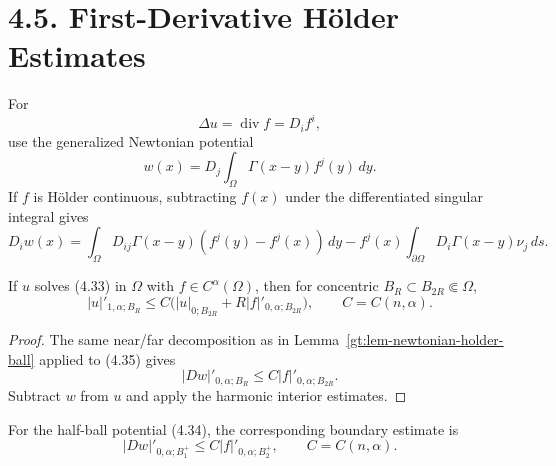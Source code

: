 \section*{4.5. First-Derivative H\"older Estimates}

For
\begin{equation}
\tag{4.33}
\Delta u=\operatorname{div}f=D_if^i,
\end{equation}
use the generalized Newtonian potential
\begin{equation}
\tag{4.34}
w(x)=D_j\int_\Omega\Gamma(x-y)f^j(y)\,dy.
\end{equation}
If $f$ is H\"older continuous, subtracting $f(x)$ under the differentiated
singular integral gives
\begin{equation}
\tag{4.35}
D_iw(x)=\int_\Omega D_{ij}\Gamma(x-y)(f^j(y)-f^j(x))\,dy
-f^j(x)\int_{\partial\Omega}D_i\Gamma(x-y)\nu_j\,ds.
\end{equation}

\begin{theorem}\label{gt:thm-poisson-first-derivative-interior}
If $u$ solves (4.33) in $\Omega$ with $f\in C^\alpha(\Omega)$, then for
concentric $B_R\subset B_{2R}\Subset\Omega$,
\begin{equation}
\tag{4.37}
|u|'_{1,\alpha;B_R}
\leq C\bigl(|u|_{0;B_{2R}}+R|f|'_{0,\alpha;B_{2R}}\bigr),
\qquad C=C(n,\alpha).
\end{equation}
\end{theorem}
\begin{proof}
\sketch The same near/far decomposition as in Lemma~\ref{gt:lem-newtonian-holder-ball}
applied to (4.35) gives
\begin{equation}
\tag{4.36}
|Dw|'_{0,\alpha;B_R}\leq C|f|'_{0,\alpha;B_{2R}}.
\end{equation}
Subtract $w$ from $u$ and apply the harmonic interior estimates.
\end{proof}

For the half-ball potential (4.34), the corresponding boundary estimate is
\begin{equation}
\tag{4.38}
|Dw|'_{0,\alpha;B_1^+}\leq C|f|'_{0,\alpha;B_2^+},
\qquad C=C(n,\alpha).
\end{equation}

